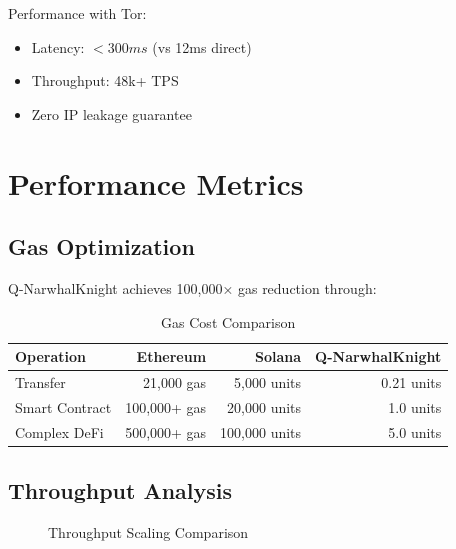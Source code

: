 \documentclass[11pt,a4paper]{article}
\begin{document}
Performance with Tor:
\begin{itemize}
    \item Latency: $< 300ms$ (vs 12ms direct)
    \item Throughput: 48k+ TPS
    \item Zero IP leakage guarantee
\end{itemize}

\section{Performance Metrics}

\subsection{Gas Optimization}

Q-NarwhalKnight achieves 100,000× gas reduction through:

\begin{table}[h]
\centering
\begin{tabular}{|l|r|r|r|}
\hline
\textbf{Operation} & \textbf{Ethereum} & \textbf{Solana} & \textbf{Q-NarwhalKnight} \\
\hline
Transfer & 21,000 gas & 5,000 units & 0.21 units \\
Smart Contract & 100,000+ gas & 20,000 units & 1.0 units \\
Complex DeFi & 500,000+ gas & 100,000 units & 5.0 units \\
\hline
\end{tabular}
\caption{Gas Cost Comparison}
\end{table}

\subsection{Throughput Analysis}

\begin{figure}[h]
\centering
{}
\caption{Throughput Scaling Comparison}
\end{figure}
\end{document}
